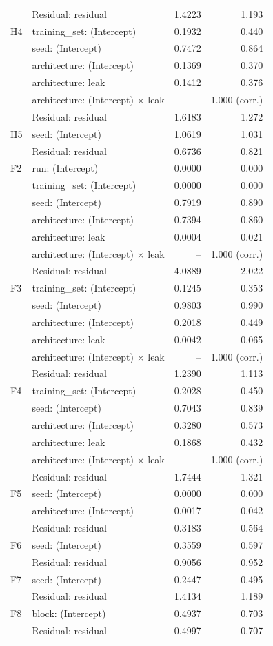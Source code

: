 {\begin{longtable}{llrr}
 & Residual: residual & 1.4223 & 1.193 \\
H4 & training\_set: (Intercept) & 0.1932 & 0.440 \\
 & seed: (Intercept) & 0.7472 & 0.864 \\
 & architecture: (Intercept) & 0.1369 & 0.370 \\
 & architecture: leak & 0.1412 & 0.376 \\
 & architecture: (Intercept) $\times$ leak & -- & 1.000 (corr.) \\
 & Residual: residual & 1.6183 & 1.272 \\
H5 & seed: (Intercept) & 1.0619 & 1.031 \\
 & Residual: residual & 0.6736 & 0.821 \\
F2 & run: (Intercept) & 0.0000 & 0.000 \\
 & training\_set: (Intercept) & 0.0000 & 0.000 \\
 & seed: (Intercept) & 0.7919 & 0.890 \\
 & architecture: (Intercept) & 0.7394 & 0.860 \\
 & architecture: leak & 0.0004 & 0.021 \\
 & architecture: (Intercept) $\times$ leak & -- & \textminus{}1.000 (corr.) \\
 & Residual: residual & 4.0889 & 2.022 \\
F3 & training\_set: (Intercept) & 0.1245 & 0.353 \\
 & seed: (Intercept) & 0.9803 & 0.990 \\
 & architecture: (Intercept) & 0.2018 & 0.449 \\
 & architecture: leak & 0.0042 & 0.065 \\
 & architecture: (Intercept) $\times$ leak & -- & \textminus{}1.000 (corr.) \\
 & Residual: residual & 1.2390 & 1.113 \\
F4 & training\_set: (Intercept) & 0.2028 & 0.450 \\
 & seed: (Intercept) & 0.7043 & 0.839 \\
 & architecture: (Intercept) & 0.3280 & 0.573 \\
 & architecture: leak & 0.1868 & 0.432 \\
 & architecture: (Intercept) $\times$ leak & -- & 1.000 (corr.) \\
 & Residual: residual & 1.7444 & 1.321 \\
F5 & seed: (Intercept) & 0.0000 & 0.000 \\
 & architecture: (Intercept) & 0.0017 & 0.042 \\
 & Residual: residual & 0.3183 & 0.564 \\
F6 & seed: (Intercept) & 0.3559 & 0.597 \\
 & Residual: residual & 0.9056 & 0.952 \\
F7 & seed: (Intercept) & 0.2447 & 0.495 \\
 & Residual: residual & 1.4134 & 1.189 \\
F8 & block: (Intercept) & 0.4937 & 0.703 \\
 & Residual: residual & 0.4997 & 0.707 \\
\end{longtable}
}
